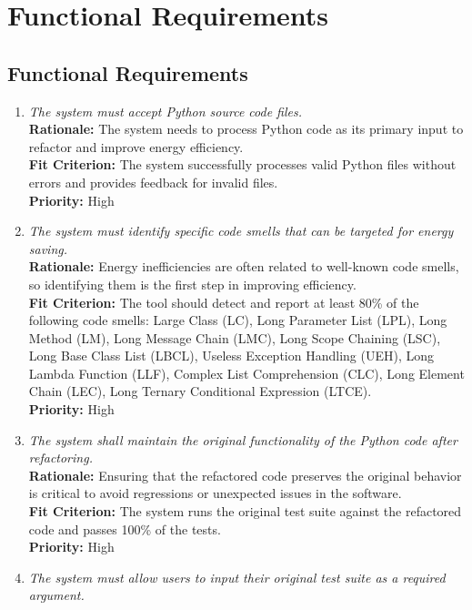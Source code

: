 \documentclass[12pt]{article}
\begin{document}
\section{Functional Requirements}
\subsection{Functional Requirements}
\begin{enumerate}[label=FR \arabic*., wide=0pt, leftmargin=*]
    \item \emph{The system must accept Python source code files.}\\
    {\bf Rationale:} The system needs to process Python code as its primary input to refactor and improve energy efficiency.\\
    {\bf Fit Criterion:} The system successfully processes valid Python files without errors and provides feedback for invalid files.\\
    {\bf Priority:} High
    \item \emph{The system must identify specific code smells that can be targeted for energy saving.}\\
    {\bf Rationale:} Energy inefficiencies are often related to well-known code smells, so identifying them is the first step in improving efficiency.\\
    {\bf Fit Criterion:} The tool should detect and report at least 80\% of the following code smells: Large Class (LC), Long Parameter List (LPL), Long Method (LM), Long Message Chain (LMC), Long Scope Chaining (LSC), Long Base Class List (LBCL), Useless Exception Handling (UEH), Long Lambda Function (LLF), Complex List Comprehension (CLC), Long Element Chain (LEC), Long Ternary Conditional Expression (LTCE).\\
    {\bf Priority:} High
    \item \emph{The system shall maintain the original functionality of the Python code after refactoring.}\\
    {\bf Rationale:} Ensuring that the refactored code preserves the original behavior is critical to avoid regressions or unexpected issues in the software.\\
    {\bf Fit Criterion:} The system runs the original test suite against the refactored code and passes 100\% of the tests.\\
    {\bf Priority:} High
    \item \emph{The system must allow users to input their original test suite as a required argument.}\\

\end{enumerate}
\end{document}
